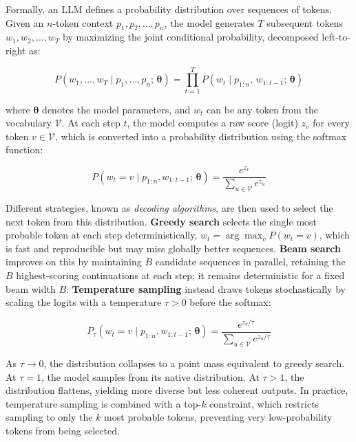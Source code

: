 Formally, an LLM defines a probability distribution over sequences of tokens. Given an $n$-token context $p_1, p_2, \ldots, p_n$, the model generates $T$ subsequent tokens $w_1, w_2, \ldots, w_T$ by maximizing the joint conditional probability, decomposed left-to-right as:

\begin{equation}\label{equ:jointprob}
    P(w_1, \ldots, w_T \mid p_1, \ldots, p_n;\, \boldsymbol{\theta}) = \prod_{t=1}^{T} P(w_t \mid p_{1:n},\, w_{1:t-1};\, \boldsymbol{\theta})
\end{equation}

where $\boldsymbol{\theta}$ denotes the model parameters, and $w_t$ can be any token from the vocabulary $\mathcal{V}$. At each step $t$, the model computes a raw score (logit) $z_v$ for every token $v \in \mathcal{V}$, which is converted into a probability distribution using the softmax function:

\begin{equation}\label{equ:softmax}
    P(w_t = v \mid p_{1:n}, w_{1:t-1};\, \boldsymbol{\theta}) = \frac{e^{z_v}}{\sum_{u \in \mathcal{V}} e^{z_u}}
\end{equation}

Different strategies, known as \textit{decoding algorithms}, are then used to select the next token from this distribution. \textbf{Greedy search} selects the single most probable token at each step deterministically, $w_t = \arg\max_{v} P(w_t = v)$, which is fast and reproducible but may miss globally better sequences. \textbf{Beam search} \citep{sutskever2014sequence} improves on this by maintaining $B$ candidate sequences in parallel, retaining the $B$ highest-scoring continuations at each step; it remains deterministic for a fixed beam width $B$. \textbf{Temperature sampling} \citep{holtzman2020curious} instead draws tokens stochastically by scaling the logits with a temperature $\tau > 0$ before the softmax:

\begin{equation}\label{equ:temperature}
    P_\tau(w_t = v \mid p_{1:n}, w_{1:t-1};\, \boldsymbol{\theta}) = \frac{e^{z_v / \tau}}{\sum_{u \in \mathcal{V}} e^{z_u / \tau}}
\end{equation}

As $\tau \to 0$, the distribution collapses to a point mass equivalent to greedy search. At $\tau = 1$, the model samples from its native distribution. At $\tau > 1$, the distribution flattens, yielding more diverse but less coherent outputs. In practice, temperature sampling is combined with a top-$k$ constraint, which restricts sampling to only the $k$ most probable tokens, preventing very low-probability tokens from being selected.

